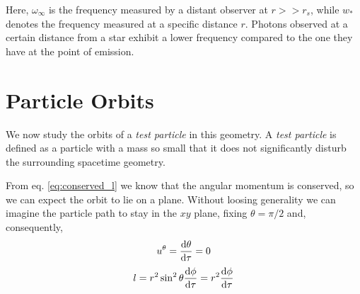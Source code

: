 Here, $\omega_\infty$ is the frequency measured by a distant observer at
$r >> r_s$, while $w_*$ denotes the frequency measured at a specific distance
$r$.
Photons observed at a certain distance from a star exhibit a lower frequency
compared to the one they have at the point of emission.


\section{Particle Orbits}

\begin{minipage}{0.4 \textwidth}
\end{minipage}
\hspace{0.02 \textwidth}
\begin{minipage}{0.57 \textwidth}
    We now study the orbits of a \textit{test particle} in this geometry.
    A \textit{test particle} is defined as a particle with a mass so small that
    it does not significantly disturb the surrounding spacetime geometry.

    From eq. \ref{eq:conserved_l} we know that the angular momentum is
    conserved, so we can expect the orbit to lie on a plane.
    Without loosing generality we can imagine the particle path to stay in the
    $xy$ plane, fixing $\theta = \pi / 2$ and, consequently,
    \begin{equation*}
        u^\theta = \dv{\theta}{\tau} = 0 
    \end{equation*}
    \begin{equation*}
        l = r^2 \sin^2 \theta \dv{\phi}{\tau} = r^2 \dv{\phi}{\tau}
    \end{equation*}
\end{minipage}



